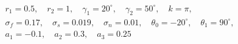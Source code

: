 $$
\begin{gathered}
r_1 = 0.5,\quad r_2 = 1,\quad \gamma_1 = 20^\circ,\quad \gamma_2 = 50^\circ,\quad k = \pi,\\
\sigma_f = 0.17,\quad \sigma_s = 0.019,\quad \sigma_n = 0.01,\quad \theta_0 = -20^\circ,\quad \theta_1 = 90^\circ,\\
a_1 = -0.1,\quad a_2 = 0.3,\quad a_3 = 0.25
\end{gathered}
$$
